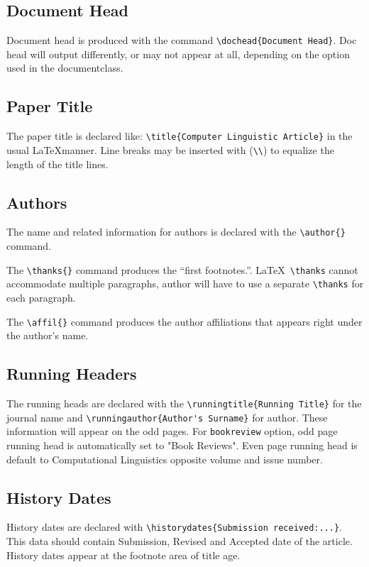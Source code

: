 \documentclass{clv3}
\begin{document}
\subsection{Document Head}

Document head is produced with the command \verb|\dochead{Document Head}|. Doc head
will output differently, or may not appear at all, depending on the option used in the
documentclass.

\subsection{Paper Title}

The paper title is declared like: \verb|\title{Computer Linguistic Article}|
in the usual \LaTeX manner. Line breaks may be inserted with (\verb|\\|) to equalize
the length of the title lines.

\subsection{Authors}
The name and related information for authors is declared with the \verb|\author{}| command.

The \verb|\thanks{}| command produces the ``first footnotes.''. \LaTeX\ \verb|\thanks|
cannot accommodate multiple paragraphs, author will have to use a separate \verb|\thanks|
for each paragraph.

The \verb|\affil{}| command produces the author affiliations that appears right under
the author's name.

\subsection{Running Headers}
The running heads are declared with the \verb|\runningtitle{Running Title}| for the
journal name and \verb|\runningauthor{Author's Surname}| for author. These information
will appear on the odd pages. For {\tt bookreview} option, odd page running head is
automatically set to "Book Reviews". Even page running head is default to Computational
Linguistics opposite volume and issue number.

\subsection{History Dates}

History dates are declared with \verb|\historydates{Submission received:...}|. This data
should contain Submission, Revised and Accepted date of the article. History dates appear
at the footnote area of title age.
\end{document}
